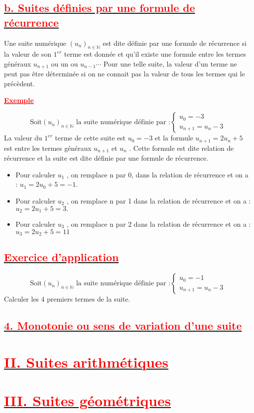 \documentclass[12pt]{article}
\begin{document}
\subsection*{\underline{\textbf{\textcolor{red}{b. Suites définies par une formule de récurrence}}}}
Une suite numérique $(u_{n})_{n\in\mathbb{N}}$ est dite définie par une formule de récurrence si la valeur de son $1^{er}$ terme
est donnée et qu’il existe une formule entre les termes généraux $u_{n+1}$ ou un ou $u_{n-1}\cdots$
Pour une telle suite, la valeur d’un terme ne peut pas être déterminée si on ne connait pas la valeur de
tous les termes qui le précèdent.

\underline{\textbf{\textcolor{red}{Exemple}}}

\[\text{Soit} (u_{n})_{n\in\mathbb{N}} \text{ la suite numérique définie par :} 
\begin{cases}
u_{0} = -3 \\
u_{n+1} =u_{n}-3
\end{cases}
\]
La valeur du $1^{er}$ terme de cette suite est $u_{0} = -3$ et la formule $u_{n+1} = 2u_{n} + 5$ est entre les termes généraux $u_{n+1}$ et $u_{n}$ . Cette formule est dite relation de récurrence et la suite est dite définie par une formule de récurrence.
\begin{itemize}
\item Pour calculer $u_{1}$ , on remplace n par 0, dans la relation de récurrence et on a : $u_{1} = 2u_{0} + 5 = -1.$

\item Pour calculer $u_{2}$ , on remplace n par 1 dans la relation de récurrence et on a : $u_{2} = 2u_{1} + 5 = 3.$

\item Pour calculer $u_{3}$ , on remplace n par 2 dans la relation de récurrence et on a : $u_{3}= 2u_{2} + 5 = 11$
\end{itemize}
\subsection*{\underline{\textbf{\textcolor{red}{Exercice d'application}}}}
\[\text{Soit} (u_{n})_{n\in\mathbb{N}} \text{ la suite numérique définie par :} 
\begin{cases}
u_{0} = -1 \\
u_{n+1} =u_{n}-3
\end{cases}
\]
Calculer les 4 premiers termes de la suite.
\subsection*{\underline{\textbf{\textcolor{red}{4. Monotonie ou sens de variation d’une suite}}}}
\section*{\underline{\textbf{\textcolor{red}{II. Suites arithmétiques}}}}
\section*{\underline{\textbf{\textcolor{red}{III. Suites géométriques}}}}
\end{document}
